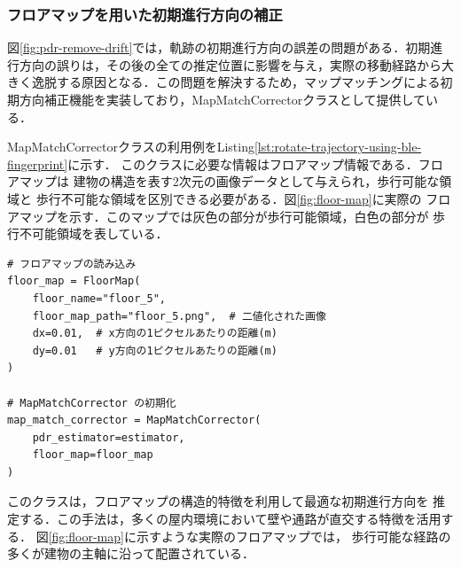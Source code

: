 

\subsubsection{フロアマップを用いた初期進行方向の補正}

図\ref{fig:pdr-remove-drift}では，軌跡の初期進行方向の誤差の問題がある．初期進行方向の誤りは，その後の全ての推定位置に影響を与え，実際の移動経路から大きく逸脱する原因となる．この問題を解決するため，マップマッチングによる初期方向補正機能を実装しており，MapMatchCorrectorクラスとして提供している．

MapMatchCorrectorクラスの利用例をListing\ref{lst:rotate-trajectory-using-ble-fingerprint}に示す．
このクラスに必要な情報はフロアマップ情報である．フロアマップは
建物の構造を表す2次元の画像データとして与えられ，歩行可能な領域と
歩行不可能な領域を区別できる必要がある．図\ref{fig:floor-map}に実際の
フロアマップを示す．このマップでは灰色の部分が歩行可能領域，白色の部分が
歩行不可能領域を表している．

\begin{lstlisting}[caption={MapMatchCorrectorの使用例},label=lst:rotate-trajectory-using-ble-fingerprint,float=ht]
# フロアマップの読み込み
floor_map = FloorMap(
    floor_name="floor_5",
    floor_map_path="floor_5.png",  # 二値化された画像
    dx=0.01,  # x方向の1ピクセルあたりの距離(m)
    dy=0.01   # y方向の1ピクセルあたりの距離(m)
)

# MapMatchCorrector の初期化
map_match_corrector = MapMatchCorrector(
    pdr_estimator=estimator,
    floor_map=floor_map
)
\end{lstlisting}

このクラスは，フロアマップの構造的特徴を利用して最適な初期進行方向を
推定する．この手法は，多くの屋内環境において壁や通路が直交する特徴を活用する．
図\ref{fig:floor-map}に示すような実際のフロアマップでは，
歩行可能な経路の多くが建物の主軸に沿って配置されている．

